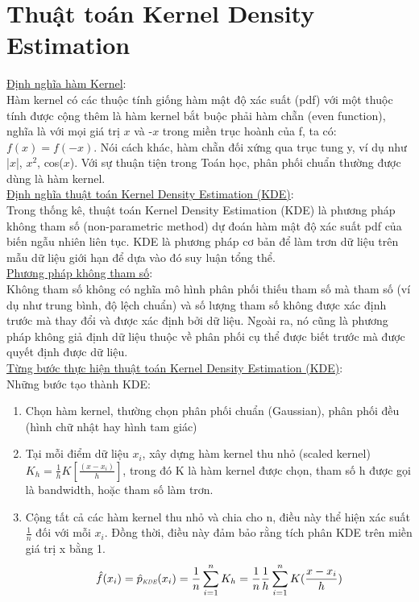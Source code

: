 \documentclass[a4paper, 13pt]{report}
\begin{document}
\section{Thuật toán Kernel Density Estimation}
\underline{Định nghĩa hàm Kernel}:\\
Hàm kernel có các thuộc tính giống hàm mật độ xác suất (pdf) với một thuộc tính được cộng thêm là hàm kernel bắt buộc phải hàm chẵn (even function), nghĩa là với mọi giá trị $x$ và -$x$ trong miền trục hoành của f, ta có: $f(x) = f(-x)$. Nói cách khác, hàm chẵn đối xứng qua trục tung y, ví dụ như |$x$|, $x^2$, cos($x$). Với sự thuận tiện trong Toán học, phân phối chuẩn thường được dùng là hàm kernel.\\
\underline{Định nghĩa thuật toán Kernel Density Estimation (KDE)}:\\
Trong thống kê, thuật toán Kernel Density Estimation (KDE) là phương pháp không tham số (non-parametric method) dự đoán hàm mật độ xác suất pdf của biến ngẫu nhiên liên tục. KDE là phương pháp cơ bản để làm trơn dữ liệu trên mẫu dữ liệu giới hạn để dựa vào đó suy luận tổng thể.\\
\underline{Phương pháp không tham số}:\\
Không tham số không có nghĩa mô hình phân phối thiếu tham số mà tham số (ví dụ như trung bình, độ lệch chuẩn) và số lượng tham số không được xác định trước mà thay đổi và được xác định bởi dữ liệu. Ngoài ra, nó cũng là phương pháp không giả định dữ liệu thuộc về phân phối cụ thể được biết trước mà được quyết định được dữ liệu.\\
\underline{Từng bước thực hiện thuật toán Kernel Density Estimation (KDE)}:\\
Những bước tạo thành KDE:\\
\begin{enumerate}
\item Chọn hàm kernel, thường chọn phân phối chuẩn (Gaussian), phân phối đều (hình chữ nhật hay hình tam giác)
\item Tại mỗi điểm dữ liệu $x_i$, xây dựng hàm kernel thu nhỏ (scaled kernel) $K_h = \frac{1}{h}K[\frac{(x-x_i)}{h}]$, trong đó K là hàm kernel được chọn, tham số h được gọi là bandwidth, hoặc tham số làm trơn. 
\item Cộng tất cả các hàm kernel thu nhỏ và chia cho n, điều này thể hiện xác suất $\frac{1}{n}$ đối với mỗi $x_i$. Đồng thời, điều này đảm bảo rằng tích phân KDE trên miền giá trị x bằng 1.\\  
\[
\hat{f}(x_i) = \hat{p}_\textit{\tiny\tiny KDE}(x_i) = \frac{1}{n}\sum_{i=1}^{n} K_h = \frac{1}{n}\frac{1}{h}\sum_{i=1}^{n} K(\frac{x-x_i}{h})
\]
\end{enumerate}
\end{document}
